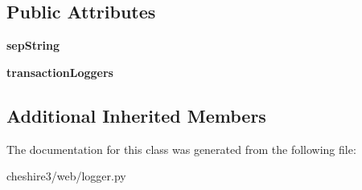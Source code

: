 \subsection*{Public Attributes}
\begin{DoxyCompactItemize}
\item 
\hypertarget{classcheshire3_1_1web_1_1logger_1_1_transaction_logger_adc523e05711b8c95968b5aa37682ca93}{{\bfseries sep\-String}}\label{classcheshire3_1_1web_1_1logger_1_1_transaction_logger_adc523e05711b8c95968b5aa37682ca93}

\item 
\hypertarget{classcheshire3_1_1web_1_1logger_1_1_transaction_logger_ada0ba9dc8aba4f29778634d1f314b7b8}{{\bfseries transaction\-Loggers}}\label{classcheshire3_1_1web_1_1logger_1_1_transaction_logger_ada0ba9dc8aba4f29778634d1f314b7b8}

\end{DoxyCompactItemize}
\subsection*{Additional Inherited Members}


The documentation for this class was generated from the following file\-:\begin{DoxyCompactItemize}
\item 
cheshire3/web/logger.\-py\end{DoxyCompactItemize}

